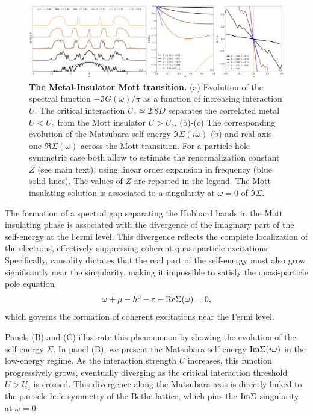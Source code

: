 \documentclass[edipack_sp.tex]{subfiles}
\begin{document}
\begin{figure}[t!]
  \includegraphics[width=\linewidth]{figures/figBethe.pdf}
    \caption{\label{figEx1}%
      \textbf{The Metal-Insulator Mott transition.}
      (a) Evolution of the spectral function $-\Im{G}(\omega)/\pi$ as
      a function of increasing interaction $U$. The critical
      interaction $U_\mathrm{c}\simeq 2.8D$ separates the correlated metal $U<U_\mathrm{c}$ from
      the Mott insulator $U>U_\mathrm{c}$.
      (b)-(c) The corresponding evolution of the Matsubara self-energy
      $\Im\Sigma(i\omega)$ (b) and
      real-axis one $\Re\Sigma(\omega)$ across the Mott
      transition. For a particle-hole symmetric case both allow to
      estimate the renormalization constant $Z$ (see main text), using
      linear order expansion in frequency (blue solid lines). The
      values of $Z$ are reported in the legend.
      The Mott insulating solution is associated to a singularity at
      $\omega=0$ of $\Im\Sigma$. 
        }
\end{figure}

The formation of a spectral gap separating the Hubbard bands in the 
Mott insulating phase is associated with the divergence of the 
imaginary part of the self-energy at the Fermi level. This divergence 
reflects the complete localization of the electrons, effectively 
suppressing coherent quasi-particle excitations. Specifically, 
causality dictates that the real part of the self-energy must also 
grow significantly near the singularity, making it impossible to 
satisfy the quasi-particle pole equation
$$
\omega+\mu-h^0-\varepsilon-{\rm Re}{\Sigma}(\omega)=0,
$$
which governs the formation of coherent excitations near the Fermi 
level.

Panels (B) and (C) illustrate this phenomenon by showing the evolution 
of the self-energy $\Sigma$. In panel (B), we present the Matsubara 
self-energy ${\rm Im}\Sigma(i\omega)$ in the low-energy regime. As the 
interaction strength $U$ increases, this function progressively 
grows, eventually diverging as the critical interaction threshold 
$U > U_\mathrm{c}$ is crossed.
This divergence along the Matsubara axis is directly linked to the
particle-hole symmetry of the Bethe lattice, which pins the  ${\rm
  Im}\Sigma$ singularity at $\omega = 0$.
\end{document}
